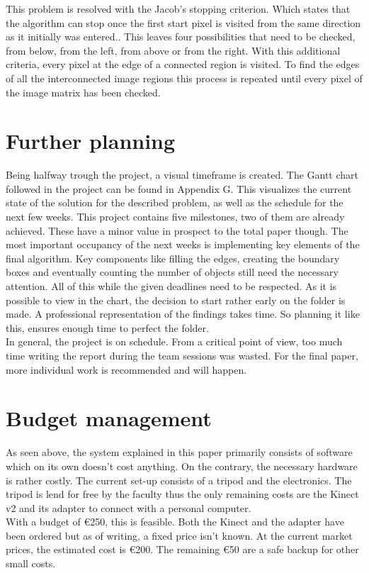 \documentclass{article}
\begin{document}
\noindent This problem is resolved with the Jacob's stopping criterion. Which states that the algorithm can stop once the first start pixel is visited from the same direction as it initially was entered.. This leaves four possibilities that need to be checked, from below, from the left, from above or from the right. With this additional criteria, every pixel at the edge of a connected region is visited. 
To find the edges of all the interconnected image regions this process is repeated until every pixel of the image matrix has been checked. 

\section{Further planning}
Being halfway trough the project, a visual timeframe is created. The Gantt chart followed in the project can be found in Appendix G.
This visualizes the current state of the solution for the described problem, as well as the schedule for the next few weeks. 
This project contains five milestones, two of them are already achieved. These have a minor value in prospect to the total paper though. The most important occupancy of the next weeks is implementing key elements of the final algorithm. Key components like filling the edges, creating the boundary boxes and eventually counting the number of objects still need the necessary attention. All of this while the given deadlines need to be respected. As it is possible to view in the chart, the decision to start rather early on the folder is made. A professional representation of the findings takes time. So planning it like this, ensures enough time to perfect the folder. \\
In general, the project is on schedule. From a critical point of view, too much time writing the report during the team sessions was wasted. For the final paper, more individual work is recommended and will happen.

\section{Budget management}
As seen above, the system explained in this paper primarily consists of software which on its own doesn't cost anything. On the contrary, the necessary hardware is rather costly. The current set-up consists of a tripod and the electronics. The tripod is lend for free by the faculty thus the only remaining costs are the Kinect v2 and its adapter to connect with a personal computer.\\
With a budget of \euro 250, this is feasible. Both the Kinect and the adapter have been ordered but as of writing, a fixed price isn't known. At the current market prices, the estimated cost is \euro 200. The remaining \euro 50 are a safe backup for other small costs.
\end{document}
